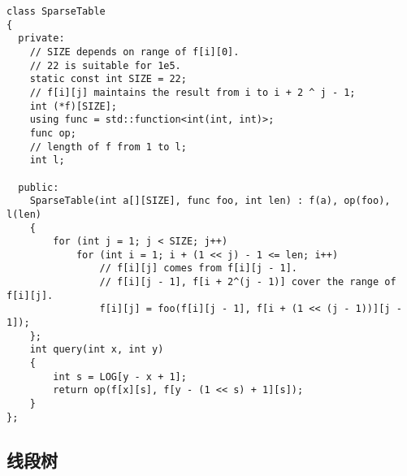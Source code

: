 \documentclass[]{article}
\begin{document}
\begin{verbatim}
class SparseTable
{
  private:
    // SIZE depends on range of f[i][0].
    // 22 is suitable for 1e5.
    static const int SIZE = 22;
    // f[i][j] maintains the result from i to i + 2 ^ j - 1;
    int (*f)[SIZE];
    using func = std::function<int(int, int)>;
    func op;
    // length of f from 1 to l;
    int l;

  public:
    SparseTable(int a[][SIZE], func foo, int len) : f(a), op(foo), l(len)
    {
        for (int j = 1; j < SIZE; j++)
            for (int i = 1; i + (1 << j) - 1 <= len; i++)
                // f[i][j] comes from f[i][j - 1].
                // f[i][j - 1], f[i + 2^(j - 1)] cover the range of f[i][j].
                f[i][j] = foo(f[i][j - 1], f[i + (1 << (j - 1))][j - 1]);
    };
    int query(int x, int y)
    {
        int s = LOG[y - x + 1];
        return op(f[x][s], f[y - (1 << s) + 1][s]);
    }
};
\end{verbatim}

\hypertarget{ux7ebfux6bb5ux6811}{%
\subsection{线段树}\label{ux7ebfux6bb5ux6811}}
\end{document}
